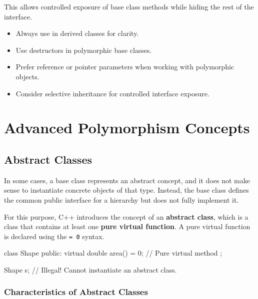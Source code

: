 This allows controlled exposure of base class methods while hiding the rest of the interface.

\begin{tipsblock}
    \begin{itemize}
        \item Always use  in derived classes for clarity.
        \item Use  destructors in polymorphic base classes.
        \item Prefer reference or pointer parameters when working with polymorphic objects.
        \item Consider selective inheritance for controlled interface exposure.
    \end{itemize}
\end{tipsblock}

\section{Advanced Polymorphism Concepts}

\subsection{Abstract Classes}

In some cases, a base class represents an abstract concept, and it does not make sense to instantiate concrete objects of that type. Instead, the base class defines the common public interface for a hierarchy but does not fully implement it.

For this purpose, C++ introduces the concept of an \textbf{abstract class}, which is a class that contains at least one \textbf{pure virtual function}. A pure virtual function is declared using the \texttt{= 0} syntax.

\begin{codeblock}[language=C++]
class Shape {
public:
    virtual double area() = 0; // Pure virtual method
};

Shape s; // Illegal! Cannot instantiate an abstract class.
\end{codeblock}

\subsubsection{Characteristics of Abstract Classes}

